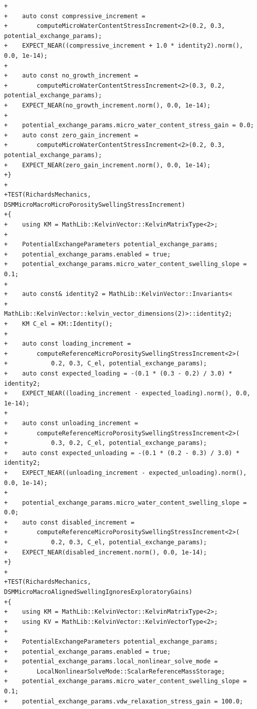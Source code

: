 \documentclass[10pt]{article}
\begin{document}
\begin{lstlisting}
+
+    auto const compressive_increment =
+        computeMicroWaterContentStressIncrement<2>(0.2, 0.3, potential_exchange_params);
+    EXPECT_NEAR((compressive_increment + 1.0 * identity2).norm(), 0.0, 1e-14);
+
+    auto const no_growth_increment =
+        computeMicroWaterContentStressIncrement<2>(0.3, 0.2, potential_exchange_params);
+    EXPECT_NEAR(no_growth_increment.norm(), 0.0, 1e-14);
+
+    potential_exchange_params.micro_water_content_stress_gain = 0.0;
+    auto const zero_gain_increment =
+        computeMicroWaterContentStressIncrement<2>(0.2, 0.3, potential_exchange_params);
+    EXPECT_NEAR(zero_gain_increment.norm(), 0.0, 1e-14);
+}
+
+TEST(RichardsMechanics, DSMMicroMacroMicroPorositySwellingStressIncrement)
+{
+    using KM = MathLib::KelvinVector::KelvinMatrixType<2>;
+
+    PotentialExchangeParameters potential_exchange_params;
+    potential_exchange_params.enabled = true;
+    potential_exchange_params.micro_water_content_swelling_slope = 0.1;
+
+    auto const& identity2 = MathLib::KelvinVector::Invariants<
+        MathLib::KelvinVector::kelvin_vector_dimensions(2)>::identity2;
+    KM C_el = KM::Identity();
+
+    auto const loading_increment =
+        computeReferenceMicroPorositySwellingStressIncrement<2>(
+            0.2, 0.3, C_el, potential_exchange_params);
+    auto const expected_loading = -(0.1 * (0.3 - 0.2) / 3.0) * identity2;
+    EXPECT_NEAR((loading_increment - expected_loading).norm(), 0.0, 1e-14);
+
+    auto const unloading_increment =
+        computeReferenceMicroPorositySwellingStressIncrement<2>(
+            0.3, 0.2, C_el, potential_exchange_params);
+    auto const expected_unloading = -(0.1 * (0.2 - 0.3) / 3.0) * identity2;
+    EXPECT_NEAR((unloading_increment - expected_unloading).norm(), 0.0, 1e-14);
+
+    potential_exchange_params.micro_water_content_swelling_slope = 0.0;
+    auto const disabled_increment =
+        computeReferenceMicroPorositySwellingStressIncrement<2>(
+            0.2, 0.3, C_el, potential_exchange_params);
+    EXPECT_NEAR(disabled_increment.norm(), 0.0, 1e-14);
+}
+
+TEST(RichardsMechanics, DSMMicroMacroAlignedSwellingIgnoresExploratoryGains)
+{
+    using KM = MathLib::KelvinVector::KelvinMatrixType<2>;
+    using KV = MathLib::KelvinVector::KelvinVectorType<2>;
+
+    PotentialExchangeParameters potential_exchange_params;
+    potential_exchange_params.enabled = true;
+    potential_exchange_params.local_nonlinear_solve_mode =
+        LocalNonlinearSolveMode::ScalarReferenceMassStorage;
+    potential_exchange_params.micro_water_content_swelling_slope = 0.1;
+    potential_exchange_params.vdw_relaxation_stress_gain = 100.0;

\end{lstlisting}
\end{document}
